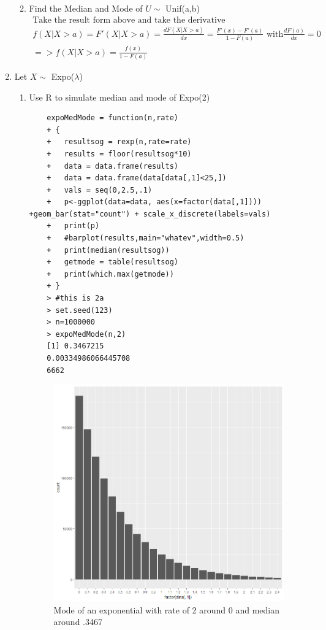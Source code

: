 \documentclass[11pt]{article}
\begin{document}
\begin{enumerate}
\begin{enumerate}
\begin{figure}[H]
	\end{figure}
	\item Find the Median and Mode of $U \sim $ Unif(a,b)
	\begin{gather}
	\text{Take the result form above and take the derivative }\\
	f(X|X>a) = F'(X|X>a) = \frac{dF(X|X>a)}{dx} = \frac{F'(x)-F'(a)}{1-F(a)} \text{ with} \frac{dF(a)}{dx} = 0 \\
	=> f(X|X>a) =\frac{f(x)}{1-F(a)}
	\end{gather}
\end{enumerate}
\item Let $ X \sim  $ Expo($ \lambda $)
\\
\begin{enumerate}
	\item Use R to simulate median and mode of Expo(2)
	\\
	\begin{verbatim}
	expoMedMode = function(n,rate)
	+ {
	+   resultsog = rexp(n,rate=rate)
	+   results = floor(resultsog*10)
	+   data = data.frame(results)
	+   data = data.frame(data[data[,1]<25,])
	+   vals = seq(0,2.5,.1)
	+   p<-ggplot(data=data, aes(x=factor(data[,1]))) +geom_bar(stat="count") + scale_x_discrete(labels=vals)
	+   print(p)
	+   #barplot(results,main="whatev",width=0.5)
	+   print(median(resultsog))
	+   getmode = table(resultsog)
	+   print(which.max(getmode))
	+ }
	> #this is 2a
	> set.seed(123)
	> n=1000000
	> expoMedMode(n,2)
	[1] 0.3467215
	0.00334986066445708 
	6662 
	\end{verbatim}
	\begin{figure}[H]
		\centering
		\caption{Mode of an exponential with rate of 2 around 0 and median around .3467}
		\includegraphics[scale=.6]{barplotexpo.png}

\end{figure}
\end{enumerate}
\end{enumerate}
\end{document}
